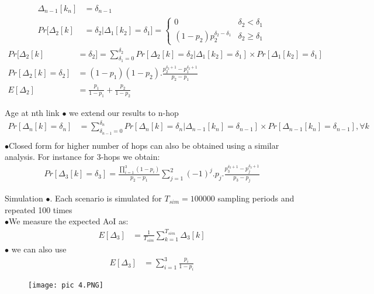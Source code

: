 \documentclass{beamer}
\begin{document}
\begin{frame}{}
 \begin{align}
\Delta_{n-1}[k_n] &= \delta_{n-1}\\
 Pr[\Delta_2[k] &= \delta_2 | \Delta_1[k_2] = \delta_1]=
 \begin{cases}
  0&\delta_2 < \delta_1\\
  (1-p_2)p_2^{\delta_2-\delta_1} &\delta_2 \geq\delta_1
 \end{cases}
 \end{align}
\begin{align}
Pr[\Delta_2[k] &= \delta_2] =\sum_{\delta_1=0}^{\delta_2}
Pr[\Delta_2[k] = \delta_2 | \Delta_1[k_2] = \delta_1]
\times Pr[\Delta_1[k_2] = \delta_1]\\
Pr[\Delta_2[k] = \delta_2] &=(1-p_1)(1-p_2).\frac{p_2^{\delta_2+1}-p_1^{\delta_2+1}}{p_2-p_1}\\
E[\Delta_2]&=\frac{p_1}{1-p_1}+\frac{p_2}{1-p_2}
\end{align}
\end{frame}

\begin{frame}{Age at nth link}
$\bullet$ we extend our results to n-hop\\
\begin{multline}
    Pr[\Delta_n[k] = \delta_n]& =\sum_{\delta_{n-1}=0}^{\delta_n}
Pr[\Delta_n[k] = \delta_n | \Delta_{n-1}[k_n] = \delta_{n-1}]
\times Pr[\Delta_{n-1}[k_n] = \delta_{n-1}], \forall k\\
\end{multline}
$\bullet$Closed form for higher number of hops can also be obtained
using a similar analysis. For instance for 3-hops we obtain:\\
\begin{align}
    Pr[\Delta_3[k]=\delta_3]=\frac{\prod_{i=1}^3(1-p_i)}{p_2-p_1}\sum_{j=1}^2(-1)^j.p_j.\frac{p_3^{\delta_3+1}-p_j^{\delta_3+1}}{p_3-p_j}
\end{align}
\end{frame}

\begin{frame}{Simulation}
   $\bullet$. Each scenario is simulated for $T_{sim} = 100 000$ sampling periods and
repeated 100 times\\
$\bullet$We measure the expected AoI as:\\
\begin{align}
    E[\Delta_3]&=\frac{1}{T_{sim}}\sum_{k=1}^{T_{sim}}\Delta_3[k]
\end{align}
   $\bullet$ we can also use\\
\begin{align}
    E[\Delta_3]&=\sum_{i=1}^3\frac{p_i}{1-p_i}
\end{align}
\end{frame}

\begin{frame}{}
  \begin{figure}[h]
    \centering
    \texttt{[image: pic 4.PNG]}
\end{figure}
\end{frame}
\end{document}
